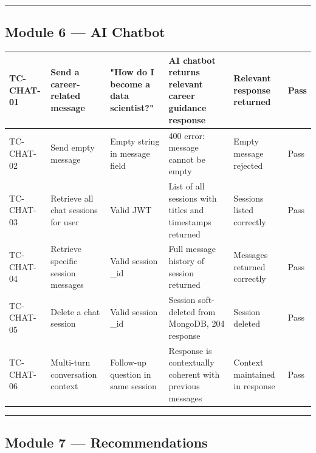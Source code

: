 \documentclass[12pt]{article}
\begin{document}
\noindent\rule{\textwidth}{0.4pt}

\subsection{Module 6 — AI Chatbot}


\begin{longtable}{|p{}|p{}|p{}|p{}|p{}|p{}|}
\hline
\textbf{TC-CHAT-01} & \textbf{Send a career-related message} & \textbf{"How do I become a data scientist?"} & \textbf{AI chatbot returns relevant career guidance response} & \textbf{Relevant response returned} & \textbf{Pass} \\ \hline
\endhead
TC-CHAT-02 & Send empty message & Empty string in message field & 400 error: message cannot be empty & Empty message rejected & Pass \\ \hline
TC-CHAT-03 & Retrieve all chat sessions for user & Valid JWT & List of all sessions with titles and timestamps returned & Sessions listed correctly & Pass \\ \hline
TC-CHAT-04 & Retrieve specific session messages & Valid session \_id & Full message history of session returned & Messages returned correctly & Pass \\ \hline
TC-CHAT-05 & Delete a chat session & Valid session \_id & Session soft-deleted from MongoDB, 204 response & Session deleted & Pass \\ \hline
TC-CHAT-06 & Multi-turn conversation context & Follow-up question in same session & Response is contextually coherent with previous messages & Context maintained in response & Pass \\ \hline
\end{longtable}



\noindent\rule{\textwidth}{0.4pt}

\subsection{Module 7 — Recommendations}
\end{document}
